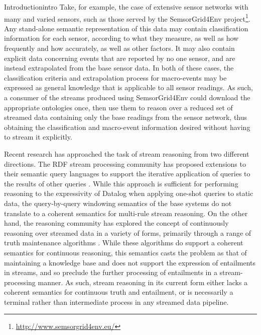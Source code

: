 \begin{nestedsection}{Introduction}{intro}
	Take, for example, the case of extensive sensor networks with many and varied sensors, such as those served by the SemsorGrid4Env project\footnote{\url{http://www.semsorgrid4env.eu/}}.
	Any stand-alone semantic representation of this data may contain classification information for each sensor, according to what they measure, as well as how frequently and how accurately, as well as other factors.
	It may also contain explicit data concerning events that are reported by no one sensor, and are instead extrapolated from the base sensor data.
	In both of these cases, the classification criteria and extrapolation process for macro-events may be expressed as general knowledge that is applicable to all sensor readings.
	As such, a consumer of the streams produced using SemsorGrid4Env could download the appropriate ontologies once, then use them to reason over a reduced set of streamed data containing only the base readings from the sensor network, thus obtaining the classification and macro-event information desired without having to stream it explicitly.

	Recent research has approached the task of stream reasoning from two different directions.
	The RDF stream processing community has proposed extensions to their semantic query languages to support the iterative application of queries to the results of other queries \citep{C-SPARQL,EP-SPARQL,walavalkar08streamingkb}.
	While this approach is sufficient for performing reasoning to the expressivity of Datalog when applying one-shot queries to static data, the query-by-query windowing semantics of the base systems do not translate to a coherent semantics for multi-rule stream reasoning.
	On the other hand, the reasoning community has explored the concept of continuously reasoning over streamed data in a variety of forms, primarily through a range of truth maintenance algorithms \citep{dred,inc-materialisation,stream-truth-maintenance}.
	While these algorithms do support a coherent semantics for continuous reasoning, this semantics casts the problem as that of maintaining a knowledge base and does not support the expression of entailments in streams, and so preclude the further processing of entailments in a stream-processing manner.
	As such, stream reasoning in its current form either lacks a coherent semantics for continuous truth and entailment, or is necessarily a terminal rather than intermediate process in any streamed data pipeline.
	

\end{nestedsection}
